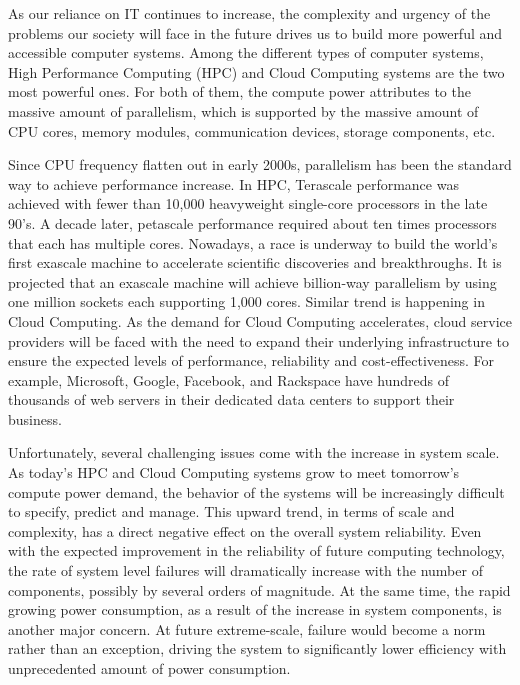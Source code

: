 As our reliance on IT continues to increase, the complexity and urgency of the problems our society will face 
in the future drives us to build more powerful and accessible computer systems. Among the different types of 
computer systems, High Performance Computing (HPC) and Cloud Computing systems are the two most powerful ones. 
For both of them, the compute power attributes to the massive amount of parallelism, which is supported by 
the massive amount of CPU cores, memory modules, communication devices, storage components, etc. 

Since CPU frequency flatten out in early 2000s, parallelism has been the standard way to achieve performance increase. 
In HPC, Terascale performance was achieved with fewer than 10,000 heavyweight single-core processors in the late 90’s. 
A decade later, petascale performance required about ten times processors that each has multiple cores. Nowadays, a race
is underway to build the world's first exascale machine to accelerate scientific discoveries and breakthroughs. It is 
projected that an exascale machine will achieve billion-way parallelism by using one million sockets each supporting 
1,000 cores. Similar trend is happening in Cloud Computing. 
As the demand for Cloud Computing accelerates, cloud service providers  
will be faced with the need to expand their underlying infrastructure to ensure the expected levels of performance, reliability and cost-effectiveness. 
For example, Microsoft, Google, Facebook, and Rackspace have hundreds of thousands 
of web servers in their dedicated data centers to support their business. 

Unfortunately, several challenging issues come with the increase in system scale. As today's HPC and Cloud Computing systems grow to 
meet tomorrow's compute power demand, the behavior of the systems will be increasingly difficult to specify, predict and manage. 
This upward trend, in terms of scale and complexity, has a direct negative effect on the overall system reliability. 
Even with the expected improvement in the reliability of future computing technology, the rate of system level failures will 
dramatically increase with the number of components, possibly by several orders of magnitude. 
At the same time, the rapid 
growing power consumption, as a result of the increase in system components, is another major concern. 
At future extreme-scale, failure would become a norm rather than an exception, 
driving the system to significantly lower efficiency with unprecedented amount of power consumption. 

